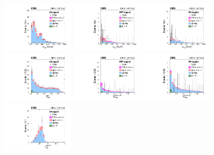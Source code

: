 \begin{figure}[!htb]
\centering
\includegraphics[width=0.31\textwidth]{figures/Figure_005-a.pdf}
\includegraphics[width=0.31\textwidth]{figures/Figure_005-b.pdf}
\includegraphics[width=0.31\textwidth]{figures/Figure_005-c.pdf}\\ 
\includegraphics[width=0.31\textwidth]{figures/Figure_005-d.pdf}
\includegraphics[width=0.31\textwidth]{figures/Figure_005-e.pdf} 
\includegraphics[width=0.31\textwidth]{figures/Figure_005-f.pdf}\\ 
\includegraphics[width=0.31\textwidth]{figures/Figure_005-g.pdf}

\end{figure}
